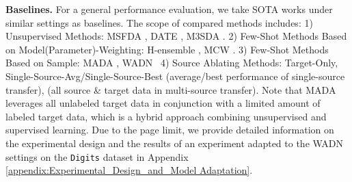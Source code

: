 

\textbf{Baselines.} For a general performance evaluation, we take SOTA works under similar settings as baselines.
The scope of compared methods includes: 
1) Unsupervised Methods: MSFDA \cite{shen2023balancingMSFDA}, DATE \cite{han2023discriminability_DATE}, M3SDA \cite{peng2019moment_M3SDA}.
2) Few-Shot Methods Based on Model(Parameter)-Weighting: H-ensemble \cite{wu2024h_Hensemble}, MCW \cite{lee2019learning_MCW}.
3) Few-Shot Methods Based on Sample: MADA \cite{zhang2024revisiting_MADA},  WADN~\cite{shui2021aggregating_WADN} 
4) Source Ablating Methods: Target-Only, Single-Source-Avg/Single-Source-Best (average/best performance of single-source transfer), \allsource{} (all source \& target data in multi-source transfer).  
Note that MADA~\cite{zhang2024revisiting_MADA} leverages all unlabeled target data in conjunction with a limited amount of labeled target data, which is a hybrid approach combining unsupervised and supervised learning. 
Due to the page limit, we provide detailed information on the experimental design and the results of an experiment adapted to the WADN settings on the \texttt{Digits} dataset in Appendix \ref{appendix:Experimental_Design_and_Model Adaptation}.
